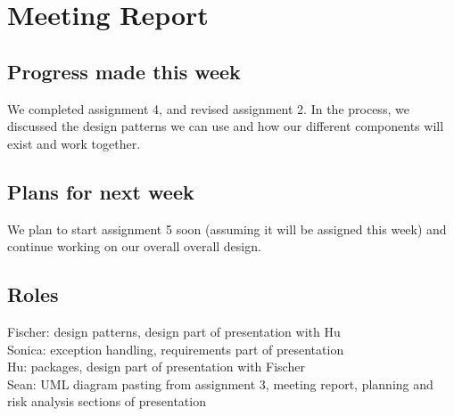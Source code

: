 \section{Meeting Report}

\subsection{Progress made this week}
We completed assignment 4, and revised assignment 2. In the process, we discussed the design patterns we can use and how our different components will exist and work together.

\subsection{Plans for next week}
We plan to start assignment 5 soon (assuming it will be assigned this week) and continue working on our overall overall design.

\subsection{Roles}
Fischer: design patterns, design part of presentation with Hu\\
Sonica: exception handling, requirements part of presentation\\
Hu: packages, design part of presentation with Fischer\\
Sean: UML diagram pasting from assignment 3, meeting report, planning and risk analysis sections of presentation\\
